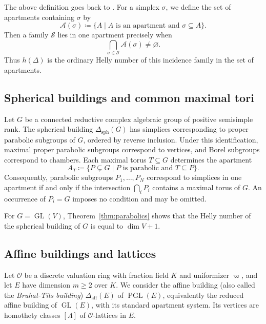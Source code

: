 \documentclass[12pt]{amsart}
\theoremstyle{definition}
\theoremstyle{remark}
\begin{document}
The above definition goes back to \cite[Section~6]{HK}.
For a simplex $\sigma$, we define the set of apartments containing $\sigma$ by
\[
  \mathcal{A}(\sigma) \coloneqq \{ A \mid A \text{ is an apartment and } \sigma \subseteq A \}.
\]
Then a family $\mathcal S$ lies in one apartment precisely when
\[
  \bigcap\limits_{\sigma\in\mathcal S}\mathcal A(\sigma)\neq\varnothing.
\]
Thus $h(\Delta)$ is the ordinary Helly number of this incidence family in the set of apartments.

\subsection{Spherical buildings and common maximal tori}

Let $G$ be a connected reductive complex algebraic group of positive semisimple rank. The spherical building $\Delta_{\mathrm{sph}}(G)$ has simplices corresponding to proper parabolic subgroups of $G$, ordered by reverse inclusion. Under this identification, maximal proper parabolic subgroups correspond to vertices, and Borel subgroups correspond to chambers. Each maximal torus $T \subseteq G$ determines the apartment
\[
  A_T \coloneqq \{ P \subsetneq G \mid P \text{ is parabolic and } T \subseteq P \}.
\]
Consequently, parabolic subgroups $P_1,\ldots,P_N$ correspond to simplices in one apartment if and only if the intersection $\bigcap\limits_iP_i$ contains a maximal torus of $G$. An occurrence of $P_i=G$ imposes no condition and may
be omitted.

For $G=\operatorname{GL}(V)$, Theorem~\ref{thm:parabolics} 
shows that the Helly number of the spherical building of $G$ is equal to $\dim V+1$.

\subsection{Affine buildings and lattices}

Let $\mathcal O$ be a discrete valuation ring with fraction field $K$ and uniformizer $\varpi$, and let $E$ have dimension $m\geq2$ over $K$. We consider the affine building (also called the \emph{Bruhat-Tits building}) $\Delta_{\mathrm{aff}}(E)$ of $\operatorname{PGL}(E)$, equivalently the reduced affine building of $\operatorname{GL}(E)$, with its standard
apartment system. Its vertices are homothety classes $[\Lambda]$
of $\mathcal O$-lattices in $E$. 
\end{document}
